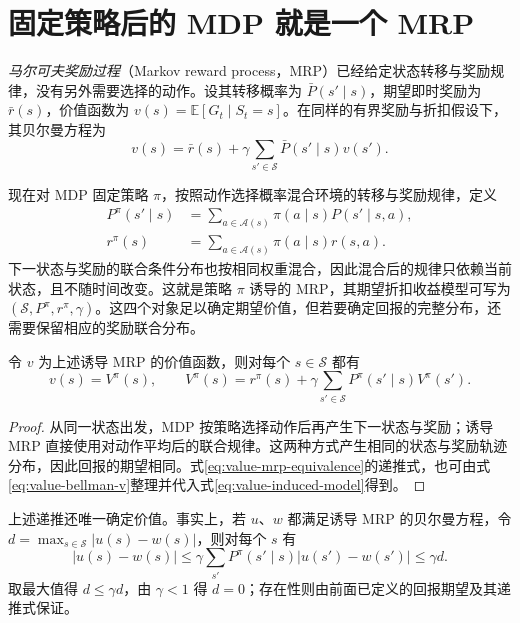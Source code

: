 \documentclass[UTF8,12pt,a4paper,fontset=fandol]{ctexart}
\begin{document}
\section{固定策略后的 MDP 就是一个 MRP}
\label{sec:value-induced-mrp}

\emph{马尔可夫奖励过程}（Markov reward process，MRP）已经给定状态转移与奖励规律，没有另外需要选择的动作。设其转移概率为 $\bar P(s'\mid s)$，期望即时奖励为 $\bar r(s)$，价值函数为 $v(s)=\mathbb E[G_t\mid S_t=s]$。在同样的有界奖励与折扣假设下，其贝尔曼方程为
\begin{equation}
  v(s)=\bar r(s)+\gamma\sum_{s'\in\mathcal S}\bar P(s'\mid s)v(s').
  \label{eq:value-mrp-bellman}
\end{equation}

现在对 MDP 固定策略 $\pi$，按照动作选择概率混合环境的转移与奖励规律，定义
\begin{equation}
  \begin{aligned}
    P^\pi(s'\mid s)&=\sum_{a\in\mathcal A(s)}\pi(a\mid s)P(s'\mid s,a),\\
    r^\pi(s)&=\sum_{a\in\mathcal A(s)}\pi(a\mid s)r(s,a).
  \end{aligned}
  \label{eq:value-induced-model}
\end{equation}
下一状态与奖励的联合条件分布也按相同权重混合，因此混合后的规律只依赖当前状态，且不随时间改变。这就是策略 $\pi$ 诱导的 MRP，其期望折扣收益模型可写为 $(\mathcal S,P^\pi,r^\pi,\gamma)$。这四个对象足以确定期望价值，但若要确定回报的完整分布，还需要保留相应的奖励联合分布。

\begin{proposition}[两种表述评价同一个过程]
\label{prop:value-mrp-equivalence}
令 $v$ 为上述诱导 MRP 的价值函数，则对每个 $s\in\mathcal S$ 都有
\begin{equation}
  v(s)=V^\pi(s),\qquad
  V^\pi(s)=r^\pi(s)+\gamma\sum_{s'\in\mathcal S}P^\pi(s'\mid s)V^\pi(s').
  \label{eq:value-mrp-equivalence}
\end{equation}
\end{proposition}

\begin{proof}
从同一状态出发，MDP 按策略选择动作后再产生下一状态与奖励；诱导 MRP 直接使用对动作平均后的联合规律。这两种方式产生相同的状态与奖励轨迹分布，因此回报的期望相同。式\eqref{eq:value-mrp-equivalence}的递推式，也可由式\eqref{eq:value-bellman-v}整理并代入式\eqref{eq:value-induced-model}得到。
\end{proof}

上述递推还唯一确定价值。事实上，若 $u$、$w$ 都满足诱导 MRP 的贝尔曼方程，令 $d=\max_{s\in\mathcal S}|u(s)-w(s)|$，则对每个 $s$ 有
\[
  |u(s)-w(s)|
  \leq\gamma\sum_{s'}P^\pi(s'\mid s)|u(s')-w(s')|
  \leq\gamma d.
\]
取最大值得 $d\leq\gamma d$，由 $\gamma<1$ 得 $d=0$；存在性则由前面已定义的回报期望及其递推式保证。
\end{document}
